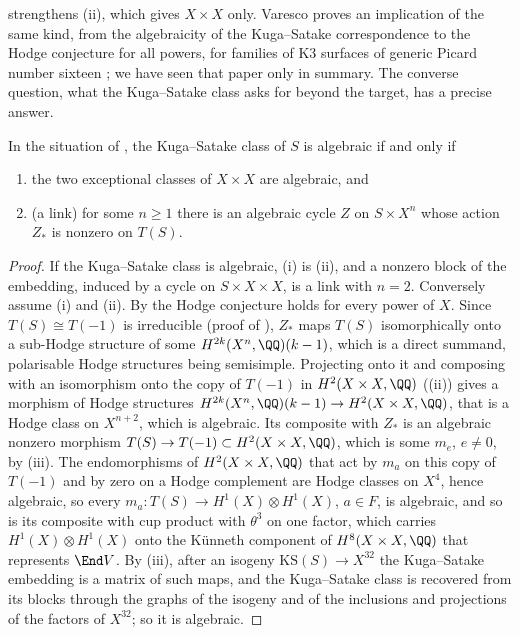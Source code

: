  strengthens (ii), which gives
$X\times X$ only. Varesco proves an implication of the same kind, from the
algebraicity of the Kuga--Satake correspondence to the Hodge conjecture for
all powers, for families of K3 surfaces of generic Picard number sixteen
\cite{Var22}; we have seen that paper only in summary. The converse question,
what the Kuga--Satake class asks for beyond the target, has a precise answer.

\begin{proposition}\label{prop:mumfordkslink}
In the situation of , the Kuga--Satake class of
$S$ is algebraic if and only if
\begin{enumerate}[label=\textup{(\roman*)},nosep,leftmargin=2.6em]
\item the two exceptional classes of $X\times X$ are algebraic, and
\item \textup{(}a link\textup{)} for some $n\ge1$ there is an algebraic cycle
  $Z$ on $S\times X^{n}$ whose action $Z_{*}$ is nonzero on $T(S)$.
\end{enumerate}
\end{proposition}

\begin{proof}
If the Kuga--Satake class is algebraic, (i) is (ii), and a
nonzero block of the embedding, induced by a cycle on $S\times X\times X$, is
a link with $n=2$. Conversely assume (i) and (ii). By
 the Hodge conjecture holds for every power of $X$.
Since $T(S)\cong T(-1)$ is irreducible (proof of ),
$Z_{*}$ maps $T(S)$ isomorphically onto a sub-Hodge structure of some
$H^{2k}(X^{n},\QQ)(k-1)$, which is a direct summand, polarisable Hodge
structures being semisimple. Projecting onto it and composing with an
isomorphism onto the copy of $T(-1)$ in $H^{2}(X\times X,\QQ)$
((ii)) gives a morphism of Hodge structures
$H^{2k}(X^{n},\QQ)(k-1)\to H^{2}(X\times X,\QQ)$, that is a Hodge class on
$X^{n+2}$, which is algebraic. Its composite with $Z_{*}$ is an algebraic
nonzero morphism $T(S)\to T(-1)\subset H^{2}(X\times X,\QQ)$, which is some
$m_{e}$, $e\ne0$, by (iii). The endomorphisms of
$H^{2}(X\times X,\QQ)$ that act by $m_{a}$ on this copy of $T(-1)$ and by zero
on a Hodge complement are Hodge classes on $X^{4}$, hence algebraic, so every
$m_{a}\colon T(S)\to H^{1}(X)\otimes H^{1}(X)$, $a\in F$, is algebraic, and so is
its composite with cup product with $\theta^{3}$ on one factor, which carries
$H^{1}(X)\otimes H^{1}(X)$ onto the K\"unneth component of $H^{8}(X\times X,\QQ)$
that represents $\End V$. By (iii), after an isogeny
$\mathrm{KS}(S)\to X^{32}$ the Kuga--Satake embedding is a matrix of such
maps, and the Kuga--Satake class is recovered from its blocks through the
graphs of the isogeny and of the inclusions and projections of the factors of
$X^{32}$; so it is algebraic.
\end{proof}


